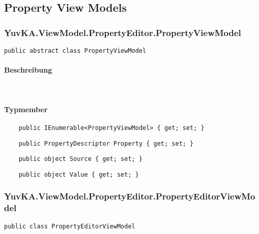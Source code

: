 \subsection{Property View Models}





\subsubsection{YuvKA.ViewModel.PropertyEditor.PropertyViewModel}

\begin{verbatim}
public abstract class PropertyViewModel
\end{verbatim}

\paragraph{Beschreibung}~\\
\paragraph{Typmember}
\begin{itemize}

	\begin{verbatim}
	public IEnumerable<PropertyViewModel> { get; set; }
	\end{verbatim}
	
	\begin{verbatim}
	public PropertyDescriptor Property { get; set; }
	\end{verbatim}

	\begin{verbatim}
	public object Source { get; set; }
	\end{verbatim}

	\begin{verbatim}
	public object Value { get; set; }
	\end{verbatim}

\end{itemize}




\subsubsection{YuvKA.ViewModel.PropertyEditor.PropertyEditorViewModel}

\begin{verbatim}
public class PropertyEditorViewModel
\end{verbatim}

